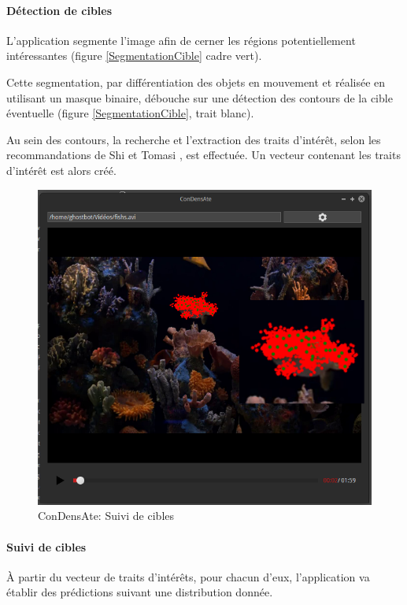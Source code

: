 \documentclass[a4paper,11pt]{report}
\begin{document}
\paragraph{Détection de cibles}
L'application segmente l'image afin de cerner les régions potentiellement intéressantes (figure \ref{SegmentationCible} cadre vert). 

Cette segmentation, par différentiation des objets en mouvement et réalisée en utilisant un masque binaire, débouche sur une détection des contours de la cible éventuelle (figure \ref{SegmentationCible}, trait blanc). 

Au sein des contours, la recherche et l'extraction des traits d'intérêt, selon les recommandations de Shi et Tomasi \cite{o}, est effectuée. Un vecteur contenant les traits d'intérêt est alors créé.\\ 

\begin{figure}[H]
\centering
\includegraphics[scale=0.45]{screenshots/condensate14.png}
\caption{ConDensAte: Suivi de cibles}
\label{SuiviCible}
\end{figure}

\paragraph{Suivi de cibles}
À partir du vecteur de traits d'intérêts, pour chacun d'eux, l'application va établir des prédictions suivant une distribution donnée. 
\end{document}
